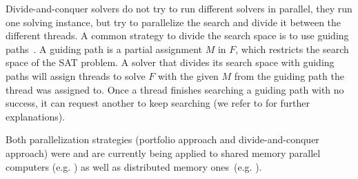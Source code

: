 Divide-and-conquer solvers do not try to run different solvers in
parallel, they run one solving instance, but try to parallelize the
search and divide it between the different threads. A common strategy
to divide the search space is to use guiding paths~\cite{psato}. A
guiding path is a partial assignment $M$ in $F$, which restricts the
search space of the SAT problem. A solver that divides its search
space with guiding paths will assign threads to solve $F$ with the
given $M$ from the guiding path the thread was assigned to. Once a
thread finishes searching a guiding path with no success, it can
request another to keep searching (we refer to \cite{paMiraXT} for
further explanations).

Both parallelization strategies (portfolio approach and
divide-and-conquer approach) were and are currently being applied to
shared memory parallel computers (e.g. \cite{plingeling}) as well as
distributed memory ones~(e.g. \cite{paMiraXT}).

